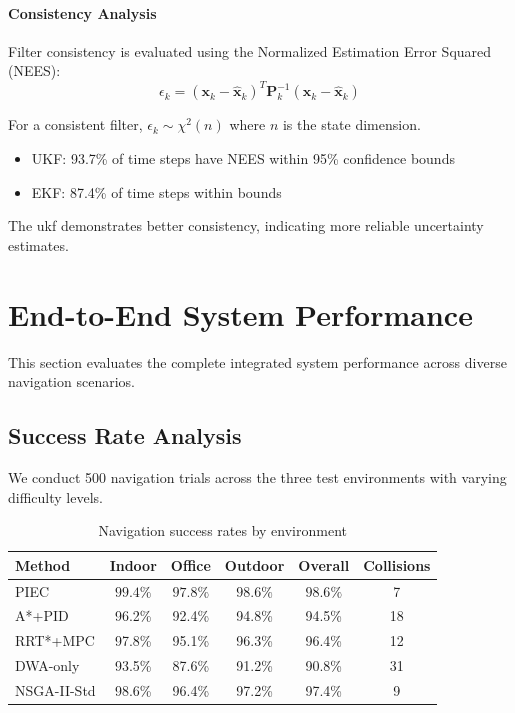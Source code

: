 \paragraph{Consistency Analysis}
Filter consistency is evaluated using the Normalized Estimation Error Squared (NEES):
\begin{equation}
\epsilon_k = (\mathbf{x}_k - \hat{\mathbf{x}}_k)^T \mathbf{P}_k^{-1} (\mathbf{x}_k - \hat{\mathbf{x}}_k)
\end{equation}

For a consistent filter, $\epsilon_k \sim \chi^2(n)$ where $n$ is the state dimension.

\begin{itemize}
    \item UKF: 93.7\% of time steps have NEES within 95\% confidence bounds
    \item EKF: 87.4\% of time steps within bounds
\end{itemize}

The \acrshort{ukf} demonstrates better consistency, indicating more reliable uncertainty estimates.


\section{End-to-End System Performance}
\label{sec:endtoend_performance}

This section evaluates the complete integrated system performance across diverse navigation scenarios.

\subsection{Success Rate Analysis}

We conduct 500 navigation trials across the three test environments with varying difficulty levels.

\begin{table}[htbp]
\centering
\caption{Navigation success rates by environment}
\label{tab:success_rates}
\begin{tabular}{lccccc}
\toprule
\textbf{Method} & \textbf{Indoor} & \textbf{Office} & \textbf{Outdoor} & \textbf{Overall} & \textbf{Collisions} \\
\midrule
PIEC & $\mathbf{99.4\%}$ & $\mathbf{97.8\%}$ & $\mathbf{98.6\%}$ & $\mathbf{98.6\%}$ & 7 \\
A*+PID & 96.2\% & 92.4\% & 94.8\% & 94.5\% & 18 \\
RRT*+MPC & 97.8\% & 95.1\% & 96.3\% & 96.4\% & 12 \\
DWA-only & 93.5\% & 87.6\% & 91.2\% & 90.8\% & 31 \\
NSGA-II-Std & 98.6\% & 96.4\% & 97.2\% & 97.4\% & 9 \\
\bottomrule
\end{tabular}
\end{table}

